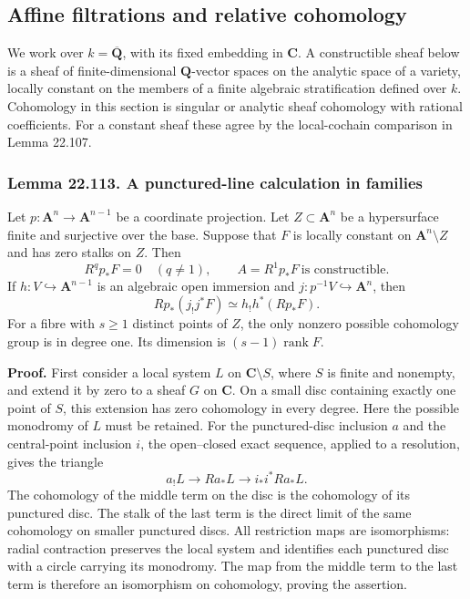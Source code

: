 \documentclass[
  11pt,
  a4paper,
]{article}
\newcounter{none} %
\begin{document}
\subsection{Affine filtrations and relative
cohomology}\label{affine-filtrations-and-relative-cohomology}

We work over \(k=\overline{\mathbf Q}\), with its fixed embedding in
\(\mathbf C\). A constructible sheaf below is a sheaf of
finite-dimensional \(\mathbf Q\)-vector spaces on the analytic space of
a variety, locally constant on the members of a finite algebraic
stratification defined over \(k\). Cohomology in this section is
singular or analytic sheaf cohomology with rational coefficients. For a
constant sheaf these agree by the local-cochain comparison in Lemma
22.107.

\subsubsection{Lemma 22.113. A punctured-line calculation in
families}\label{lemma-22.113.-a-punctured-line-calculation-in-families}

Let \(p:\mathbf A^n\to\mathbf A^{n-1}\) be a coordinate projection. Let
\(Z\subset\mathbf A^n\) be a hypersurface finite and surjective over the
base. Suppose that \(F\) is locally constant on
\(\mathbf A^n\setminus Z\) and has zero stalks on \(Z\). Then \[
 R^qp_*F=0\quad(q\ne1),\qquad
 A=R^1p_*F\ \text{is constructible}.
 \tag{22.284}
\] If \(h:V\hookrightarrow\mathbf A^{n-1}\) is an algebraic open
immersion and \(j:p^{-1}V\hookrightarrow\mathbf A^n\), then \[
 Rp_*(j_!j^*F)\simeq h_!h^*(Rp_*F).
 \tag{22.285}
\] For a fibre with \(s\ge1\) distinct points of \(Z\), the only nonzero
possible cohomology group is in degree one. Its dimension is
\((s-1)\operatorname{rank}F\).

\textbf{Proof.} First consider a local system \(L\) on
\(\mathbf C\setminus S\), where \(S\) is finite and nonempty, and extend
it by zero to a sheaf \(G\) on \(\mathbf C\). On a small disc containing
exactly one point of \(S\), this extension has zero cohomology in every
degree. Here the possible monodromy of \(L\) must be retained. For the
punctured-disc inclusion \(a\) and the central-point inclusion \(i\),
the open--closed exact sequence, applied to a resolution, gives the
triangle \[
 a_!L\longrightarrow Ra_*L
       \longrightarrow i_*i^*Ra_*L.
 \tag{22.286}
\] The cohomology of the middle term on the disc is the cohomology of
its punctured disc. The stalk of the last term is the direct limit of
the same cohomology on smaller punctured discs. All restriction maps are
isomorphisms: radial contraction preserves the local system and
identifies each punctured disc with a circle carrying its monodromy. The
map from the middle term to the last term is therefore an isomorphism on
cohomology, proving the assertion.
\end{document}
